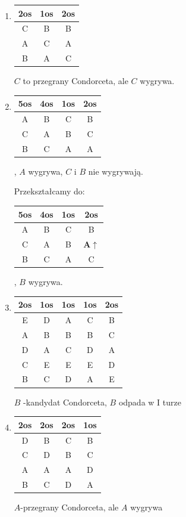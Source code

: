 \documentclass[12pt,a4paper]{article}
\theoremstyle{break}
\begin{document}
\begin{enumerate}[K1)]
			\item \begin{tabular}{|c|c|c|}\hline
				2os & 1os & 2os\\\hline
				C & B & B\\\hline
				A & C & A\\\hline
				B & A & C\\\hline
			\end{tabular} $C$ to przegrany Condorceta, ale $C$ wygrywa.
			
			\item \begin{tabular}{|c|c|c|c|}\hline
				5os & 4os & 1os & 2os\\\hline
				A & B & C & B\\\hline
				C & A & B & C\\\hline
				B & C & A & A\\\hline
			\end{tabular}, $A$ wygrywa, $C$ i $B$ nie wygrywają.
			
			Przekształcamy do: \begin{tabular}{|c|c|c|c|}\hline
				5os & 4os & 1os & 2os\\\hline
				A & B & C & B\\\hline
				C & A & B & \textbf{A$\uparrow$}\\\hline
				B & C & A & C\\\hline
			\end{tabular}, $B$ wygrywa.
			
			\item \begin{tabular}{|c|c|c|c|c|}\hline
				2os & 1os & 1os & 1os & 2os\\\hline
				E & D & A & C & B\\\hline
				A & B & B & B & C\\\hline
				D & A & C & D & A\\\hline
				C & E & E & E & D\\\hline
				B & C & D & A & E\\\hline
			\end{tabular}
			$B$ -kandydat Condorceta, $B$ odpada w I turze
			
			\item \begin{tabular}{|c|c|c|c|}\hline
				2os & 2os & 2os & 1os\\\hline
				D & B & C & B\\\hline
				C & D & B & C\\\hline
				A & A & A & D\\\hline
				B & C & D & A\\\hline
			\end{tabular} $A$-przegrany Condorceta, ale $A$ wygrywa
			 
		\end{enumerate}
\end{document}
